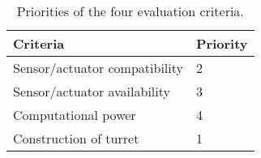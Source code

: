 \begin{table}[H]
\centering
\begin{tabular}{|l|l|}
\hline
\textbf{Criteria} & \textbf{Priority} \\ 
\hline
Sensor/actuator compatibility & 2  \\ 
\hline
Sensor/actuator availability & 3  \\ 
\hline
Computational power & 4  \\ 
\hline
Construction of turret & 1 \\ 
\hline
\end{tabular}
\caption{Priorities of the four evaluation criteria.}
\label{tab:critimportance}
\end{table}
\FloatBarrier